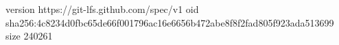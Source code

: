 version https://git-lfs.github.com/spec/v1
oid sha256:4c8234d0fbc65de66f001796ac16e6656b472abe8f8f2fad805f923ada513699
size 240261
